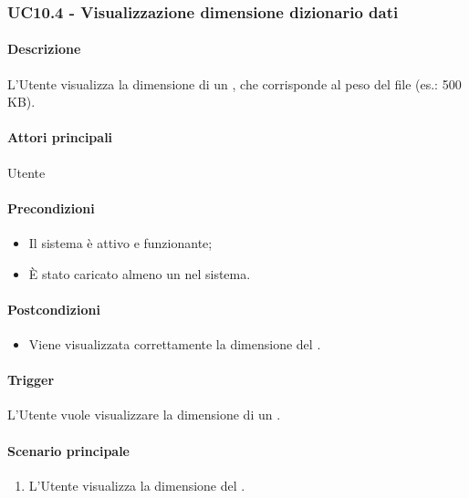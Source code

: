 \subsubsection{UC10.4 - Visualizzazione dimensione dizionario dati}\label{UC10point4}
\paragraph*{Descrizione}
L'Utente visualizza la dimensione di un , che corrisponde al peso del file (es.: 500 KB).

\paragraph*{Attori principali}
Utente

\paragraph*{Precondizioni}
\begin{itemize}
  \item Il sistema è attivo e funzionante;
  \item È stato caricato almeno un  nel sistema. 
\end{itemize}

\paragraph*{Postcondizioni}
\begin{itemize}
  \item Viene visualizzata correttamente la dimensione del .
\end{itemize}

\paragraph*{Trigger}
L'Utente vuole visualizzare la dimensione di un .

\paragraph*{Scenario principale}
\begin{enumerate}
  \item L'Utente visualizza la dimensione del .
\end{enumerate}


